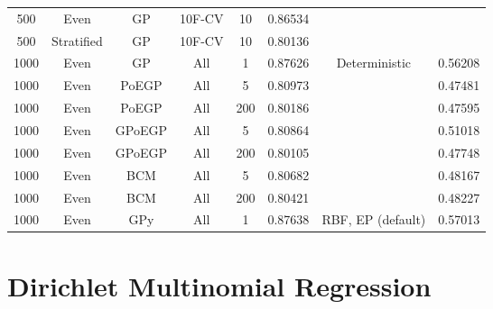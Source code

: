 \begin{tabular}{|c|c|c|c|c|c|c|c|}
    \hline
    500     & Even       & GP     & 10F-CV & 10        & 0.86534    &                     &         \\
    500     & Stratified & GP     & 10F-CV & 10        & 0.80136    &                     &         \\
    1000    & Even       & GP     & All    & 1         & 0.87626    & Deterministic       & 0.56208 \\
    1000    & Even       & PoEGP  & All    & 5         & 0.80973    &                     & 0.47481 \\
    1000    & Even       & PoEGP  & All    & 200       & 0.80186    &                     & 0.47595 \\
    1000    & Even       & GPoEGP & All    & 5         & 0.80864    &                     & 0.51018 \\
    1000    & Even       & GPoEGP & All    & 200       & 0.80105    &                     & 0.47748 \\
    1000    & Even       & BCM    & All    & 5         & 0.80682    &                     & 0.48167 \\
    1000    & Even       & BCM    & All    & 200       & 0.80421    &                     & 0.48227 \\
    1000    & Even       & GPy    & All    & 1         & 0.87638    & RBF, EP (default)   & 0.57013 \\
    \hline
\end{tabular}


\section{Dirichlet Multinomial Regression}


